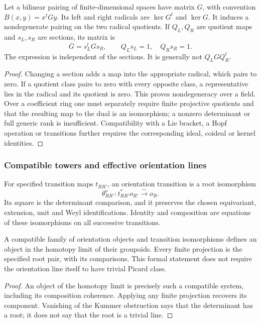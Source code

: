 \begin{proposition}
\label{prop:orientation-cy3-pairing-nondegeneracy}
Let a bilinear pairing of finite-dimensional spaces have matrix
\(G\), with convention \(B(x,y)=x^tGy\).  Its left and right
radicals are \(\ker G^t\) and \(\ker G\).  It induces a
nondegenerate pairing on the two radical quotients.  If \(Q_L,Q_R\)
are quotient maps and \(s_L,s_R\) are sections, its matrix is
\[
 \overline G=s_L^tGs_R,\qquad Q_Ls_L=1,\quad Q_Rs_R=1.
\]
The expression is independent of the sections.  It is generally not
\(Q_LGQ_R^t\).
\end{proposition}
\begin{proof}
Changing a section adds a map into the appropriate radical, which
pairs to zero.  If a quotient class pairs to zero with every opposite
class, a representative lies in the radical and its quotient is
zero.  This proves nondegeneracy over a field.  Over a coefficient
ring one must separately require finite projective quotients and
that the resulting map to the dual is an isomorphism; a nonzero
determinant or full generic rank is insufficient.  Compatibility
with a Lie bracket, a Hopf operation or transitions further requires
the corresponding ideal, coideal or kernel identities.
\end{proof}

\subsubsection*{Compatible towers and effective orientation lines}

\begin{definition}
\label{def:transition-orientation-preservation}
For specified transition maps \(t_{RR'}\), an orientation transition
is a root isomorphism
\[
 \theta^o_{RR'}:t_{RR'}^*o_{R'}\xrightarrow{\sim}o_R.
\]
Its square is the determinant comparison, and it preserves the
chosen equivariant, extension, unit and Weyl identifications.
Identity and composition are equations of these isomorphisms on
all successive transitions.
\end{definition}

\begin{proposition}
\label{prop:transition-orientation-preservation-criterion}
\label{prop:orientation-class-inverse-limit-survival}
A compatible family of orientation objects and transition
isomorphisms defines an object in the homotopy limit of their
groupoids.  Every finite projection is the specified root pair,
with its comparisons.  This formal statement does not require the
orientation line itself to have trivial Picard class.
\end{proposition}
\begin{proof}
An object of the homotopy limit is precisely such a compatible
system, including its composition coherence.  Applying any finite
projection recovers its component.  Vanishing of the Kummer
obstruction says that the determinant has a root; it does not say
that the root is a trivial line.
\end{proof}

